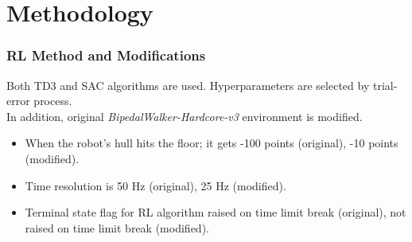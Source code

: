 \documentclass{beamer}
\begin{document}

\section{Methodology}

\begin{frame}
\frametitle{RL Method and Modifications}
Both TD3 and SAC algorithms are used. Hyperparameters are selected by trial-error process. \\
In addition, original \textit{BipedalWalker-Hardcore-v3} environment is modified.\\
\begin{itemize}
	\item When the robot's hull hits the floor; it gets -100 points (original), -10 points (modified). 
	\item Time resolution is 50 Hz (original), 25 Hz (modified).
	\item Terminal state flag for RL algorithm raised on time limit break (original), not raised on time limit break (modified). 
\end{itemize}
\end{frame}
\end{document}
